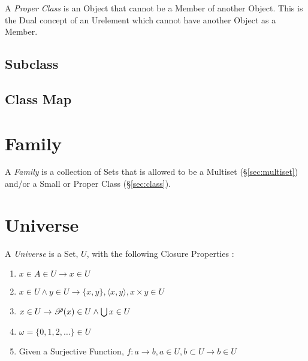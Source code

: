 A \emph{Proper Class} is an Object that cannot be a Member of another
Object. This is the Dual concept of an Urelement which cannot have
another Object as a Member.



\subsection{Subclass}\label{sec:subclass}

\subsection{Class Map}\label{sec:class_map}



\section{Family}\label{sec:family}

A \emph{Family} is a collection of Sets that is allowed to be a
Multiset (\S\ref{sec:multiset}) and/or a Small or Proper Class
(\S\ref{sec:class}).



\section{Universe}\label{sec:universe}

A \emph{Universe} is a Set, $U$, with the following Closure Properties
\cite{maclane69}:
\begin{enumerate}
\item $x \in A \in U \rightarrow x \in U$
\item $x \in U \wedge y \in U \rightarrow \{x,y\}, \langle x,y
  \rangle, x \times y \in U$
\item $x \in U \rightarrow \mathscr{P}(x) \in U \wedge \bigcup x \in U$
\item $\omega = \{0,1,2,\ldots\} \in U$
\item Given a Surjective Function, $f : a \rightarrow b, a \in
  U, b \subset U \rightarrow b \in U$
\end{enumerate}



